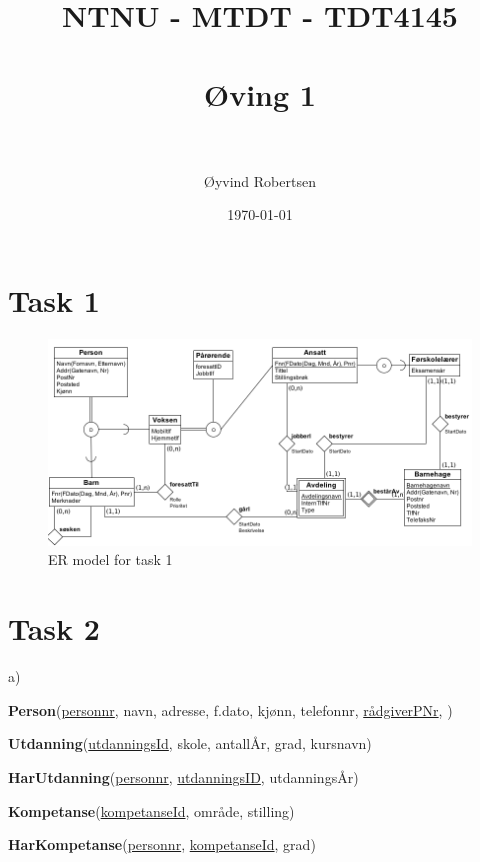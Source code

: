 \documentclass[paper=a4, fontsize=11pt]{scrartcl} %
\title{%
\normalfont \normalsize
\textsc{NTNU - MTDT - TDT4145} \\ [25pt] %
\horrule{0.5pt} \\[0.4cm] %
\huge {Øving 1} \\ %
\horrule{2pt} \\[0.5cm] %
}
\author{Øyvind Robertsen} %
\date{\normalsize\today} %
\numberwithin{equation}{section} %
\numberwithin{figure}{section} %
\numberwithin{table}{section} %
\begin{document}
\maketitle %

\section*{Task 1}

\begin{figure}[h!]
\centering
\includegraphics[width=\textwidth]{oppg1.png}
\caption{ER model for task 1}
\end{figure}

\newpage
\section*{Task 2}

a)

\textbf{Person}(\underline{personnr}, navn, adresse, f.dato, kjønn, telefonnr, \underline{rådgiverPNr}, \underline{})

\textbf{Utdanning}(\underline{utdanningsId}, skole, antallÅr, grad, kursnavn)

\textbf{HarUtdanning}(\underline{personnr}, \underline{utdanningsID}, utdanningsÅr)

\textbf{Kompetanse}(\underline{kompetanseId}, område, stilling)

\textbf{HarKompetanse}(\underline{personnr}, \underline{kompetanseId}, grad)
\end{document}
